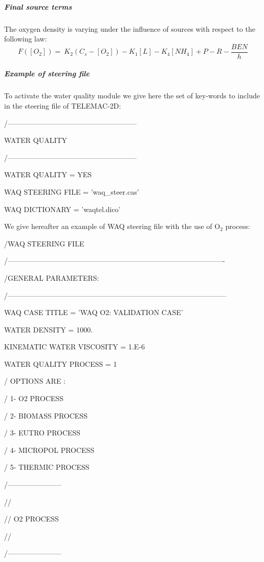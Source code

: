 \documentclass{article} %
\begin{document}
\subparagraph{ Final source terms}

 The oxygen density is varying under the influence of sources with respect to the following law:
\[F\left([O_2]\right)=\ K_2\left(C_s-[O_2]\right)-K_1\left[L\right]-K_4\left[NH_4\right]+P-R-\frac{BEN}{h}\]


\subparagraph{ Example of steering file}

 To activate the water quality module we give here the set of key-words to include in the steering file of TELEMAC-2D:

 /------------------------------------------------------

   WATER QUALITY

 /------------------------------------------------------

 WATER QUALITY           = YES

 WAQ STEERING FILE    = 'waq\_steer.cas'

 WAQ DICTIONARY         = 'waqtel.dico'

 We give hereafter an example of WAQ steering file with the use of O${}_{2}$ process:



 /WAQ STEERING FILE

 /-------------------------------------------------------------------------------------------

 /GENERAL PARAMETERS:

 /--------------------------------------------------------------------------------------------

 WAQ CASE TITLE                = 'WAQ O2: VALIDATION CASE'

 WATER DENSITY                 = 1000.

 KINEMATIC WATER VISCOSITY      = 1.E-6

 WATER QUALITY PROCESS         = 1

 /   OPTIONS ARE :

 /       1- O2 PROCESS

 /       2- BIOMASS PROCESS

 /       3- EUTRO PROCESS

 /       4- MICROPOL PROCESS

 /       5- THERMIC PROCESS

 /-----------------------

 //

 // O2 PROCESS

 //

 /-----------------------
\end{document}
